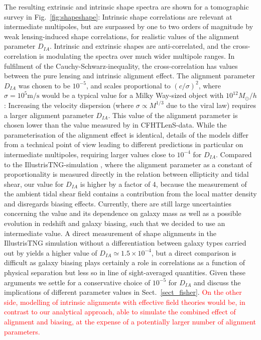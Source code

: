 \documentclass[a4paper,fleqn,usenatbib]{mnras}
\newcommand\spirou[1]{\textcolor{red}{#1}}
\begin{document}
The resulting extrinsic and intrinsic shape spectra are shown for a tomographic survey in Fig.~\ref{fig:shapeshape}: Intrinsic shape correlations are relevant at intermediate multipoles, but are surpassed by one to two orders of magnitude by weak lensing-induced shape correlations, for realistic values of the alignment parameter $D_{IA}$. Intrinsic and extrinsic shapes are anti-correlated, and the cross-correlation is modulating the spectra over much wider multipole ranges. In fulfilment of the Cauchy-Schwarz-inequality, the cross-correlation has values between the pure lensing and intrinsic alignment effect. The alignment parameter $D_{IA}$ was chosen to be $10^{-5}$, and scales proportional to $(c/\sigma)^2$, where $\sigma=10^5\mathrm{m}/\mathrm{s}$ would be a typical value for a Milky Way-sized object with $10^{12} M_\odot/h$: Increasing the velocity dispersion (where $\sigma\propto M^{1/3}$ due to the viral law) requires a larger alignment parameter $D_{IA}$. This value of the alignment parameter is chosen lower than the value measured by \citet{tugendhat_angular_2018} in CFHTLenS-data. While the parameterisation of the alignment effect is identical, details of the models differ from a technical point of view \citep[][who compute the correlations in real-space before Fourier-transforming into Fourier-space, whereas our model is set up entirely in Fourier-space]{tugendhat_angular_2018} leading to different predictions in particular on intermediate multipoles, requiring larger values close to $10^{-4}$ for $D_{IA}$. Compared to the IllustrisTNG-simulation \citep{Zjupa_tng_2020}, where the alignment parameter as a constant of proportionality is measured directly in the relation between ellipticity and tidal shear, our value for $D_{IA}$ is higher by a factor of 4, because the measurement of the ambient tidal shear field contains a contribution from the local matter density and disregards biasing effects. Currently, there are still large uncertainties concerning the value and its dependence on galaxy mass as well as a possible evolution in redshift and galaxy biasing, such that we decided to use an intermediate value. A direct measurement of shape alignments in the IllustrisTNG simulation without a differentiation between galaxy types carried out by \citet{hilbert_intrinsic_2016} yields a higher value of $D_{IA}\simeq1.5\times10^{-4}$, but a direct comparison is difficult as galaxy biasing plays certainly a role in correlations as a function of physical separation but less so in line of sight-averaged quantities. Given these arguments we settle for a conservative choice of $10^{-5}$ for $D_{IA}$ and discuss the implications of different parameter values in Sect.~\ref{sect_fisher}. \spirou{On the other side, modelling of intrinsic alignments with effective field theories \citep{blazek_beyond_2017,fang_fast-pt_2017} would be, in contrast to our analytical approach, able to simulate the combined effect of alignment and biasing, at the expense of a potentially larger number of alignment parameters.}
\end{document}
